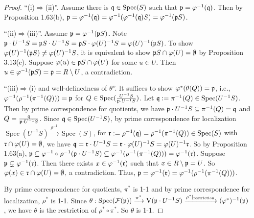 \begin{proof}
    ``(i)$\Rightarrow$(ii)''. Assume there is $\mathfrak{q} \in \operatorname{Spec}(S)$ such that $\mathfrak{p} = \varphi^{-1}(\mathfrak{q})$. Then by Proposition 1.63(b), $\mathfrak{p} = \varphi^{-1}(\mathfrak{q}) = \varphi^{-1}(\varphi^{-1}(\mathfrak{q})S) = \varphi^{-1}(\mathfrak{p} S)$. \par 
    ``(ii)$\Rightarrow$(iii)''. Assume $\mathfrak{p} = \varphi^{-1}(\mathfrak{p} S)$. Note $\mathfrak{p} \cdot U^{-1}S = \mathfrak{p} S \cdot U^{-1}S = \mathfrak{p} S \cdot \varphi(U)^{-1}S = \varphi(U)^{-1} (\mathfrak{p} S)$. To show $\varphi(U)^{-1}(\mathfrak{p} S) \neq \varphi(U)^{-1}S$, it is equivalent to show $\mathfrak{p} S \cap \varphi(U) = \emptyset$ by Proposition 3.13(c). Suppose $\varphi(u) \in \mathfrak{p} S \cap \varphi(U)$ for some $u \in U$. Then $u \in \varphi^{-1}(\mathfrak{p} S) = \mathfrak{p} = R \setminus U$, a contradiction. \par 
    ``(iii)$\Rightarrow$(i) and well-definedness of $\theta$''. It suffices to show $\varphi^{*}(\theta(Q)) = \mathfrak{p}$, i.e., $\varphi^{-1}(\rho^{-1}(\pi^{-1}(Q))) = \mathfrak{p}$ for $Q \in \operatorname{Spec}(\frac{U^{-1}S}{\mathfrak{p} \cdot U^{-1}S})$. Let $\mathfrak{q} := \pi^{-1}(Q) \in \operatorname{Spec}(U^{-1}S)$. Then by prime correspondence for quotients, we have $\mathfrak{p} \cdot U^{-1} S \subseteq \pi^{-1}(Q) = \mathfrak{q}$ and $Q = \frac{\mathfrak{q}}{\mathfrak{p} \cdot U^{-1}S}$. Since $\mathfrak{q} \in \operatorname{Spec}(U^{-1}S)$, by prime correspondence for localization $\operatorname{Spec}(U^{-1}S) \xrightarrow{\rho^{-1}} \operatorname{Spec}(S)$, for $\mathfrak{r} := \rho^{-1}(\mathfrak{q}) = \rho^{-1}(\pi^{-1}(Q)) \in \operatorname{Spec}(S)$ with $\mathfrak{r} \cap \varphi(U) = \emptyset$, we have $\mathfrak{q} = \mathfrak{r} \cdot U^{-1}S = \mathfrak{r} \cdot \varphi(U)^{-1}S = \varphi(U)^{-1}\mathfrak{r}$. So by Proposition 1.63(a), $\mathfrak{p} \subseteq \varphi^{-1} \circ \rho^{-1}(\mathfrak{p} \cdot U^{-1}S) \subseteq \varphi^{-1}(\rho^{-1}(\pi^{-1}(Q))) = \varphi^{-1}(\mathfrak{r})$. Suppose $\mathfrak{p} \subsetneq \varphi^{-1}(\mathfrak{r})$. Then there exists $x \in \varphi^{-1}(\mathfrak{r})$ such that $x \in R \setminus \mathfrak{p} = U$. So $\varphi(x) \in \mathfrak{r} \cap \varphi(U) = \emptyset$, a contradiction. Thus, $\mathfrak{p} = \varphi^{-1}(\mathfrak{r}) = \varphi^{-1}(\rho^{-1}(\pi^{-1}(Q)))$. \par 
    By prime correspondence for quotients, $\pi^{*}$ is 1-1 and by prime correspondence for localization, $\rho^{*}$ is 1-1. Since $\theta: \operatorname{Spec}(\mathcal{F}(\mathfrak{p})) \xrightarrow{\pi^{*}} \operatorname{V}(\mathfrak{p} \cdot U^{-1}S) \xrightarrow{\rho^{*}|_{\text{restriction}}} (\varphi^{*})^{-1}(\mathfrak{p})$, we have $\theta$ is the restriction of $\rho^{*} \circ \pi^{*}$. So $\theta$ is 1-1. \par 

\end{proof}
